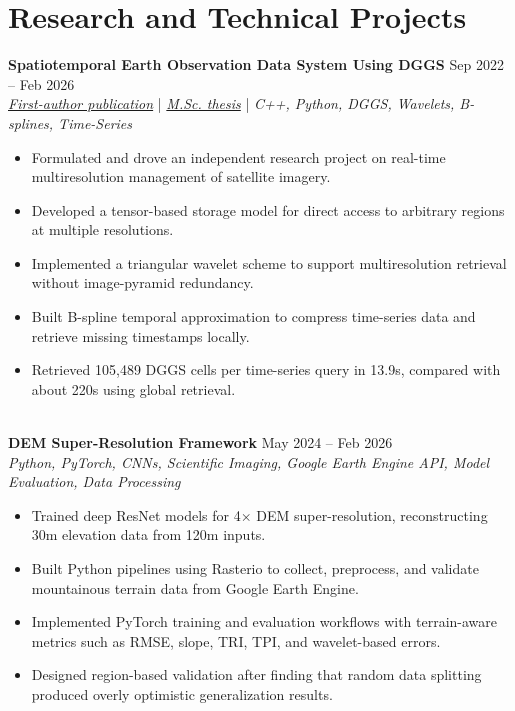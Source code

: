 \documentclass[a4paper,10pt]{article}
\begin{document}

\section*{Research and Technical Projects}

\noindent
\textbf{Spatiotemporal Earth Observation Data System Using DGGS} \hfill Sep 2022 -- Feb 2026 \\
\textit{\href{https://doi.org/10.3390/rs17040570}{First-author publication}} | \textit{\href{https://ucalgary.scholaris.ca/items/114b394b-e516-4732-bd3a-45dd6160d480}{M.Sc. thesis}} | \textit{C++, Python, DGGS, Wavelets, B-splines, Time-Series}
\begin{itemize}[leftmargin=0.25in]
    \item Formulated and drove an independent research project on real-time multiresolution management of satellite imagery.
    \item Developed a tensor-based storage model for direct access to arbitrary regions at multiple resolutions.
    \item Implemented a triangular wavelet scheme to support multiresolution retrieval without image-pyramid redundancy.
    \item Built B-spline temporal approximation to compress time-series data and retrieve missing timestamps locally.
    \item Retrieved 105,489 DGGS cells per time-series query in 13.9s, compared with about 220s using global retrieval.
\end{itemize}

\noindent \\
\textbf{DEM Super-Resolution Framework} \hfill May 2024 -- Feb 2026 \\
\textit{Python, PyTorch, CNNs, Scientific Imaging, Google Earth Engine API, Model Evaluation, Data Processing}
\begin{itemize}[leftmargin=0.25in]
    \item Trained deep ResNet models for 4$\times$ DEM super-resolution, reconstructing 30m elevation data from 120m inputs.
    \item Built Python pipelines using Rasterio to collect, preprocess, and validate mountainous terrain data from Google Earth Engine.
    \item Implemented PyTorch training and evaluation workflows with terrain-aware metrics such as RMSE, slope, TRI, TPI, and wavelet-based errors.
    \item Designed region-based validation after finding that random data splitting produced overly optimistic generalization results.
\end{itemize}
\end{document}
